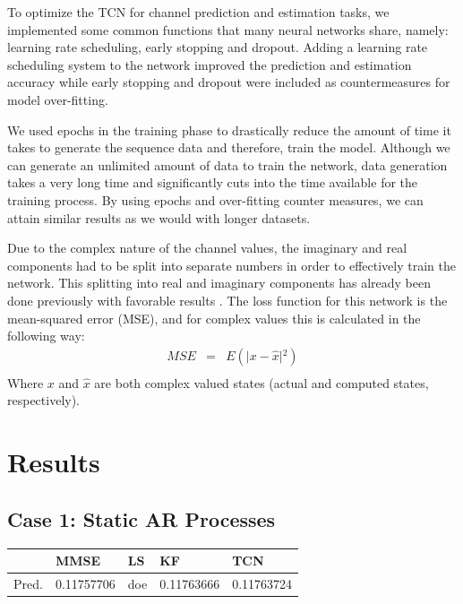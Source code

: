 \documentclass[twocolumn,letterpaper]{IEEEAerospaceCLS}  %
\begin{document}
To optimize the TCN for channel prediction and estimation tasks, we implemented some common functions that many neural networks share, namely: learning rate scheduling, early stopping and dropout. Adding a learning rate scheduling system to the network improved the prediction and estimation accuracy while early stopping and dropout were included as countermeasures for model over-fitting. 

We used epochs in the training phase to drastically reduce the amount of time it takes to generate the sequence data and therefore, train the model. Although we can generate an unlimited amount of data to train the network, data generation takes a very long time and significantly cuts into the time available for the training process. By using epochs and over-fitting counter measures, we can attain similar results as we would with longer datasets. 

Due to the complex nature of the channel values, the imaginary and real components had to be split into separate numbers in order to effectively train the network. This splitting into real and imaginary components has already been done previously with favorable results \cite{tacspinar2010back}.  The loss function for this network is the mean-squared error (MSE), and for complex values this is calculated in the following way:
\begin{eqnarray*}
MSE&=&E(\lvert {x-\hat{x}}\rvert{^2}) \\
\end{eqnarray*}
Where $x$ and $\hat{x}$ are both complex valued states (actual and computed states, respectively). 


\section{Results}
\label{sec:results}

\subsection{Case 1: Static AR Processes}

\begin{table}[!h]
\begin{tabular}{|l|l|l|l|l|}
\hline
                            & MMSE                 & LS        & KF         & TCN                   \\ \hline
\multirow{3}{*}{Pred.} & \multirow{3}{*}{0.11757706} & \multirow{3}{*}{doe} & \multirow{3}{*}{0.11763666} & \multirow{3}{*}{0.11763724} \\
                            &                      &                      &                       &                       \\
                            &                      &                      &                       &                       \\ \hline
\end{tabular}
\end{table}
\end{document}
